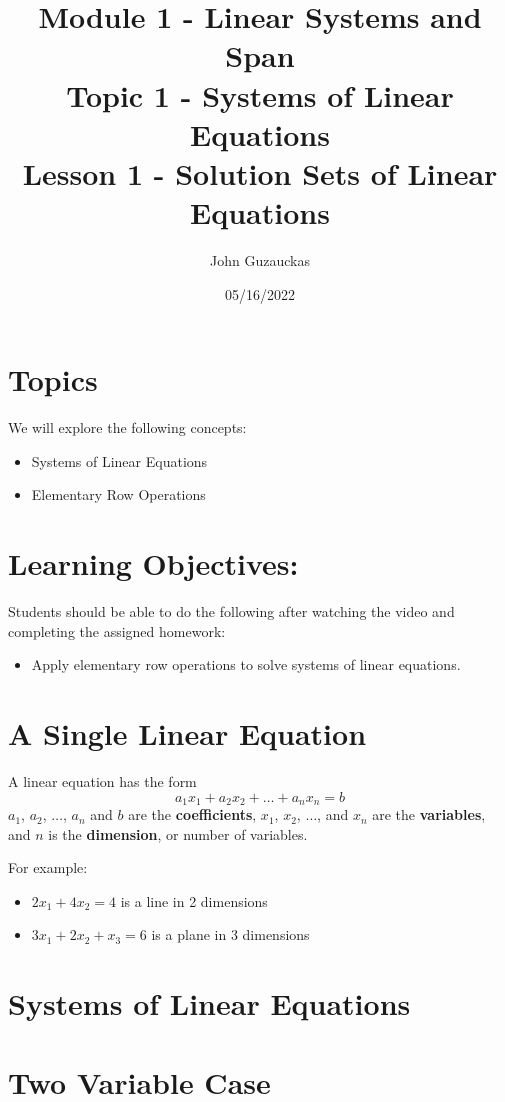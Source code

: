 \documentclass{article}
\title{Module 1 - Linear Systems and Span \\
        Topic 1 - Systems of Linear Equations \\
        Lesson 1 - Solution Sets of Linear Equations}
\author{John Guzauckas}
\date{05/16/2022}
\begin{document}
\maketitle

\section{Topics}
We will explore the following concepts:

\begin{itemize}
    \item Systems of Linear Equations
    \item Elementary Row Operations
\end{itemize}

\section{Learning Objectives:}
Students should be able to do the following after watching the video and
completing the assigned homework:

\begin{itemize}
    \item Apply elementary row operations to solve systems of linear equations.
\end{itemize}

\section{A Single Linear Equation}
A linear equation has the form
$$a_{1}x_{1} + a_{2}x_{2} + \dots + a_{n}x_{n} = b$$
$a_{1}$, $a_{2}$, $\dots$, $a_{n}$ and $b$ are the \textbf{coefficients}, 
$x_{1}$, $x_{2}$, $\dots$, and $x_{n}$ are the \textbf{variables}, 
and $n$ is the \textbf{dimension}, or number of variables.

For example:

\begin{itemize}
    \item $2x_{1} + 4x_{2} = 4$ is a line in 2 dimensions
    \item $3x_{1} + 2x_{2} + x_{3} = 6$ is a plane in 3 dimensions
\end{itemize}

\section{Systems of Linear Equations}

\section{Two Variable Case}
\end{document}

